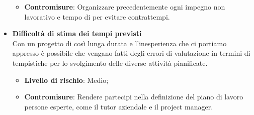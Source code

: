 \begin{itemize}
\begin{itemize}
	      	\item \textbf{Contromisure}: Organizzare precedentemente ogni impegno non lavorativo e tempo di  per evitare contrattempi.
	      \end{itemize}
	\item \textbf{Difficoltà di stima dei tempi previsti}\\
	      Con un progetto di così lunga durata e l'inesperienza che ci portiamo appresso è possibile che vengano fatti degli errori di valutazione in termini di tempistiche per lo svolgimento delle diverse attività pianificate.
	      \begin{itemize}
	      	\item \textbf{Livello di rischio}: Medio;
	      	\item \textbf{Contromisure}: Rendere partecipi nella definizione del piano di lavoro persone esperte, come il tutor aziendale e il project manager.
	      \end{itemize}
\end{itemize}
